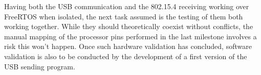 		
		Having both the USB communication and the 802.15.4 receiving working over FreeRTOS when isolated, the next task assumed is the testing of them both working together. While they should theoretically coexist without conflicts, the manual mapping of the processor pins performed in the last milestone involves a risk this won't happen. Once such hardware validation has concluded, software validation is also to be conducted by the development of a first version of the USB sending program.

